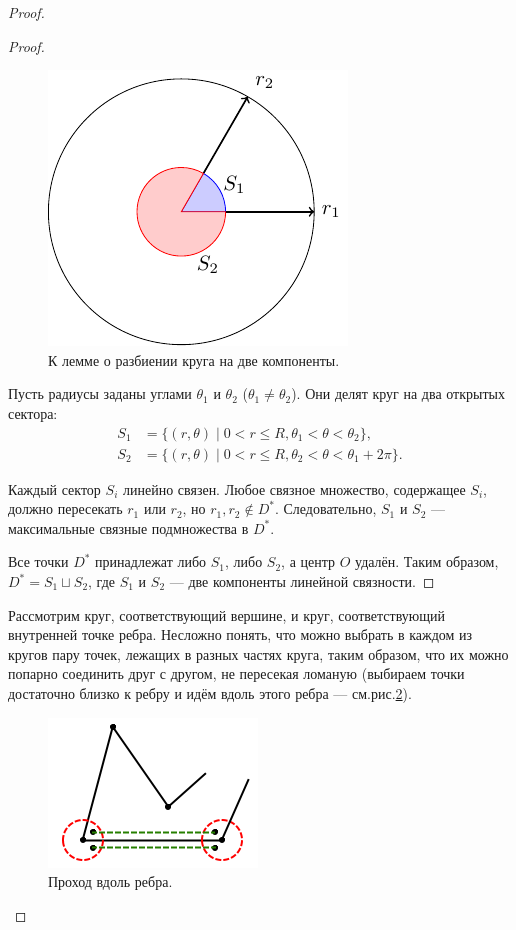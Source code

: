 \begin{proof}
\begin{proof}
        \begin{figure}[h]
            \centering
            \includegraphics[scale=1]{images/c4.7.pdf}
            \caption{К лемме о разбиении круга на две компоненты.}
            \label{fig:c4.7}
        \end{figure}

        Пусть радиусы заданы углами $\theta_1$ и $\theta_2$ ($\theta_1 \neq \theta_2$). Они делят круг на два открытых сектора:
        \begin{align*}
            S_1 &= \{ (r,\theta) \mid 0 < r \leq R, \theta_1 < \theta < \theta_2 \}, \\
            S_2 &= \{ (r,\theta) \mid 0 < r \leq R, \theta_2 < \theta < \theta_1 + 2\pi \}.
        \end{align*}

        Каждый сектор $S_i$ линейно связен.
        Любое связное множество, содержащее $S_i$, должно пересекать $r_1$ или $r_2$, но $r_1, r_2 \notin D^*$. Следовательно, $S_1$ и $S_2$ — максимальные связные подмножества в $D^*$.

        Все точки $D^*$ принадлежат либо $S_1$, либо $S_2$, а центр $O$ удалён. Таким образом, $D^* = S_1 \sqcup S_2$, где $S_1$ и $S_2$ — две компоненты линейной связности.
    \end{proof}

    Рассмотрим круг, соответствующий вершине, и круг, соответствующий внутренней точке ребра. Несложно понять, что можно выбрать в каждом из кругов пару точек, лежащих в разных частях круга, таким образом, что их можно попарно соединить друг с другом, не пересекая ломаную (выбираем точки достаточно близко к ребру и идём вдоль этого ребра — см.рис.\ref{fig:c4.2}).

    \begin{figure}[h]
        \centering
        \includegraphics{images/c4.2.png}
        \caption{Проход вдоль ребра.}
        \label{fig:c4.2}
    \end{figure}


\end{proof}
